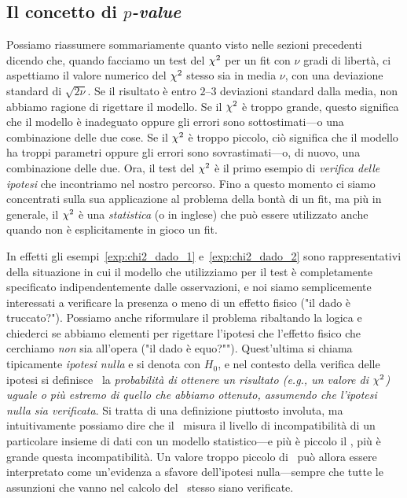 \subsection{Il concetto di \emph{\texorpdfstring{$p$}{p}-value}}
\label{sec:pvalue}

Possiamo riassumere sommariamente quanto visto nelle sezioni precedenti dicendo
che, quando facciamo un test del $\chi^2$ per un fit con $\nu$ gradi di
libertà, ci aspettiamo il valore numerico del $\chi^2$ stesso sia in media
$\nu$, con una deviazione standard di $\sqrt{2\nu}$. Se il risultato è entro
$2$--$3$ deviazioni standard dalla media, non abbiamo ragione di rigettare il
modello. Se il $\chi^2$ è troppo grande, questo significa che il modello è
inadeguato oppure gli errori sono sottostimati---o una combinazione delle due
cose. Se il $\chi^2$ è troppo piccolo, ciò significa che il modello ha
troppi parametri oppure gli errori sono sovrastimati---o, di nuovo, una
combinazione delle due. Ora, il test del $\chi^2$ è il primo esempio di
\emph{verifica delle ipotesi} che incontriamo nel nostro percorso. Fino a
questo momento ci siamo concentrati sulla sua applicazione al problema della
bontà di un fit, ma più in generale, il $\chi^2$ è una \emph{statistica}
(o  in inglese) che può essere utilizzato anche quando
non è esplicitamente in gioco un fit.

In effetti gli esempi~\ref{exp:chi2_dado_1} e~\ref{exp:chi2_dado_2} sono
rappresentativi della situazione in cui il modello che utilizziamo per il test
è completamente specificato indipendentemente dalle osservazioni, e noi siamo
semplicemente interessati a verificare la presenza o meno di un effetto fisico
("il dado è truccato?"). Possiamo anche riformulare il problema ribaltando
la logica e chiederci se abbiamo elementi per rigettare l'ipotesi che l'effetto
fisico che cerchiamo \emph{non} sia all'opera ("il dado è equo?"").
Quest'ultima si chiama tipicamente \emph{ipotesi nulla} e si denota con $H_0$,
e nel contesto della verifica delle ipotesi si definisce \pvalue\ la
\emph{probabilità di ottenere un risultato (e.g., un valore di $\chi^2$)
  uguale o più estremo di quello che abbiamo ottenuto, assumendo che
  l'ipotesi nulla sia verificata}. Si tratta di una definizione piuttosto
involuta, ma intuitivamente possiamo dire che il \pvalue\ misura il livello
di incompatibilità di un particolare insieme di dati con un modello
statistico---e più è piccolo il \pvalue, più è grande questa
incompatibilità. Un valore troppo piccolo di \pvalue\ può allora essere
interpretato come un'evidenza a sfavore dell'ipotesi nulla---sempre che tutte
le assunzioni che vanno nel calcolo del \pvalue\ stesso siano verificate.

